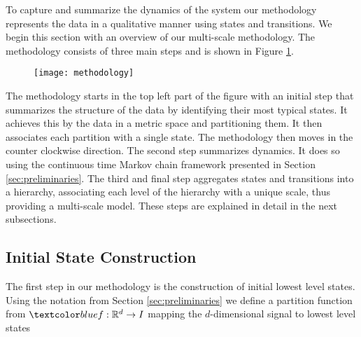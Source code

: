 \iffalse
\begin{itemize}
	\item Initial state construction (State Identification)
	\item Aggregation (State Aggregation)
	\item Transition probabililties (Modeling transitions)
\end{itemize}
\fi

To capture and summarize the dynamics of the system our methodology represents the data
in a qualitative manner using states and transitions. We begin this section with an overview
of our multi-scale methodology. The methodology consists of three main steps and is
shown in Figure \ref{fig:methodology}.
\begin{figure}[h!]
	\centering
	\texttt{[image: methodology]}
	\caption{}
	\label{fig:methodology}
\end{figure}
The methodology starts in the top left part of the figure with an initial step that summarizes
the structure of the data by identifying their most typical states. It achieves this by 
the data in a  metric space and partitioning them. It then associates
each partition with a single state.
The methodology then moves in the counter clockwise direction. The second step summarizes
dynamics. It does so using the continuous time Markov chain framework presented in Section \ref{sec:preliminaries}.
The third and final step aggregates states and transitions into a hierarchy, associating each
level of the hierarchy with a unique scale, thus providing a multi-scale model. These steps 
are explained in detail in the next subsections.


\subsection{Initial State Construction}
\label{sec:framework-states}

The first step in our methodology is the construction of initial lowest level states. Using the notation
from Section \ref{sec:preliminaries} we define a partition function 
from $\lstopar{f}: \mathbb{R}^d \rightarrow I$ mapping the $d$-dimensional signal to lowest level states

